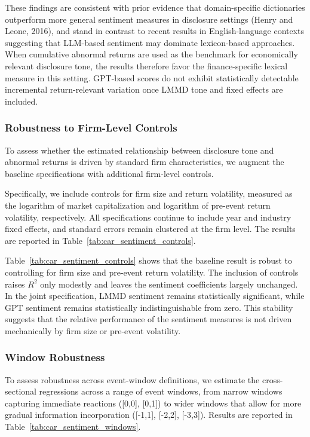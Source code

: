 These findings are consistent with prior evidence that domain-specific dictionaries outperform more general sentiment measures in disclosure settings (Henry and Leone, 2016), and stand in contrast to recent results in English-language contexts suggesting that LLM-based sentiment may dominate lexicon-based approaches. When cumulative abnormal returns are used as the benchmark for economically relevant disclosure tone, the results therefore favor the finance-specific lexical measure in this setting. GPT-based scores do not exhibit statistically detectable incremental return-relevant variation once LMMD tone and fixed effects are included.

\subsubsection{Robustness to Firm-Level Controls}
\label{sec:controls_robustness}

To assess whether the estimated relationship between disclosure tone and abnormal returns is driven by standard firm characteristics, we augment the baseline specifications with additional firm-level controls.

Specifically, we include controls for firm size and return volatility, measured as the logarithm of market capitalization and logarithm of pre-event return volatility, respectively. All specifications continue to include year and industry fixed effects, and standard errors remain clustered at the firm level. The results are reported in Table~\ref{tab:car_sentiment_controls}.


\FloatBarrier

Table~\ref{tab:car_sentiment_controls} shows that the baseline result is robust to controlling for firm size and pre-event return volatility. The inclusion of controls raises $R^2$ only modestly and leaves the sentiment coefficients largely unchanged. In the joint specification, LMMD sentiment remains statistically significant, while GPT sentiment remains statistically indistinguishable from zero. This stability suggests that the relative performance of the sentiment measures is not driven mechanically by firm size or pre-event volatility.

\subsubsection{Window Robustness}

To assess robustness across event-window definitions, we estimate the cross-sectional regressions across a range of event windows, from narrow windows capturing immediate reactions ([0,0], [0,1]) to wider windows that allow for more gradual information incorporation ([-1,1], [-2,2], [-3,3]). Results are reported in Table~\ref{tab:car_sentiment_windows}.

